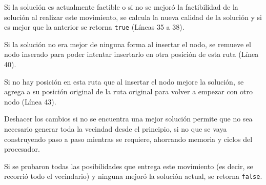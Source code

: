 Si la solución es actualmente factible o si no se mejoró la factibilidad de la solución al realizar este movimiento, se calcula la nueva calidad de la solución y si es mejor que la anterior se retorna \texttt{true} (Líneas 35 a 38).

Si la solución no era mejor de ninguna forma al insertar el nodo, se remueve el nodo inserado para poder intentar insertarlo en otra posición de esta ruta (Línea 40).

Si no hay posición en esta ruta que al insertar el nodo mejore la solución, se agrega a su posición original de la ruta original para volver a empezar con otro nodo (Línea 43).

Deshacer los cambios si no se encuentra una mejor solución permite que no sea necesario generar toda la vecindad desde el principio, si no que se vaya construyendo paso a paso mientras se requiere, ahorrando memoria y ciclos del procesador.

Si se probaron todas las posibilidades que entrega este movimiento (es decir, se recorrió todo el vecindario) y ninguna mejoró la solución actual, se retorna \texttt{false}.

